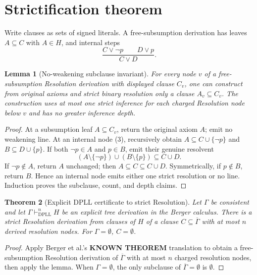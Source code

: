 \documentclass[11pt]{article}
\newtheorem{theorem}{Theorem}
\newtheorem{lemma}[theorem]{Lemma}
\newcommand{\KNOWN}{\textbf{KNOWN THEOREM}}
\begin{document}
\section{Strictification theorem}
Write clauses as sets of signed literals.  A free-subsumption derivation has
leaves $A\subseteq C$ with $A\in H$, and internal steps
\[
     \frac{C\vee\neg p\qquad D\vee p}{C\vee D}.          \tag{3}
\]

\begin{lemma}[No-weakening subclause invariant]
For every node $v$ of a free-subsumption Resolution derivation with displayed
clause $C_v$, one can construct from original axioms and strict binary
resolution only a clause $A_v\subseteq C_v$.  The construction uses at most
one strict inference for each charged Resolution node below $v$ and has no
greater inference depth.
\end{lemma}

\begin{proof}
At a subsumption leaf $A\subseteq C_v$, return the original axiom $A$; emit
no weakening line.  At an internal node (3), recursively obtain
$A\subseteq C\cup\{\neg p\}$ and $B\subseteq D\cup\{p\}$.
If both $\neg p\in A$ and $p\in B$, emit their genuine resolvent
\[
              (A\setminus\{\neg p\})\cup(B\setminus\{p\})
              \subseteq C\cup D.                         \tag{4}
\]
If $\neg p\notin A$, return $A$ unchanged; then $A\subseteq C\subseteq
C\cup D$.  Symmetrically, if $p\notin B$, return $B$.  Hence an internal
node emits either one strict resolution or no line.  Induction proves the
subclause, count, and depth claims.
\end{proof}

\begin{theorem}[Explicit DPLL certificate to strict Resolution]
Let $\Gamma$ be consistent and let
$\Gamma\vdash_{\mathrm{DPLL}}^n H$ be an explicit tree derivation in the
Berger calculus.  There is a strict Resolution derivation from clauses of
$H$ of a clause $C\subseteq\overline\Gamma$ with at most $n$ derived
resolution nodes.  For $\Gamma=\emptyset$, $C=\emptyset$.
\end{theorem}

\begin{proof}
Apply Berger et al.'s \KNOWN{} translation to obtain a free-subsumption
Resolution derivation of $\overline\Gamma$ with at most $n$ charged
resolution nodes, then apply the lemma.  When $\Gamma=\emptyset$, the only
subclause of $\overline\Gamma=\emptyset$ is $\emptyset$.
\end{proof}
\end{document}
